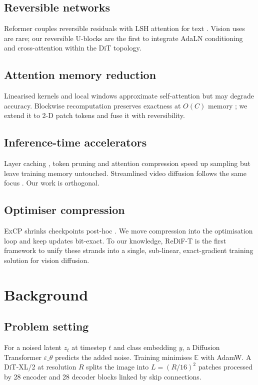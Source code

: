 \documentclass{article}
\begin{document}
\subsection{Reversible networks}
Reformer couples reversible residuals with LSH attention for text \cite{kitaev-2020-reformer}. Vision uses are rare; our reversible U-blocks are the first to integrate AdaLN conditioning and cross-attention within the DiT topology.
\subsection{Attention memory reduction}
Linearised kernels \cite{likhosherstov-2020-sub} and local windows \cite{liu-2021-swin} approximate self-attention but may degrade accuracy. Blockwise recomputation preserves exactness at \(O(C)\) memory \cite{liu-2023-blockwise}; we extend it to 2-D patch tokens and fuse it with reversibility.
\subsection{Inference-time accelerators}
Layer caching \cite{ma-2024-learning}, token pruning \cite{wang-2024-attention} and attention compression \cite{yuan-2024-ditfastattn} speed up sampling but leave training memory untouched. Streamlined video diffusion follows the same focus \cite{zhan-2024-fast}. Our work is orthogonal.
\subsection{Optimiser compression}
ExCP shrinks checkpoints post-hoc \cite{li-2024-excp}. We move compression into the optimisation loop and keep updates bit-exact.
To our knowledge, ReDiF-T is the first framework to unify these strands into a single, sub-linear, exact-gradient training solution for vision diffusion.

\section{Background}
\subsection{Problem setting}
For a noised latent \(z_t\) at timestep \(t\) and class embedding \(y\), a Diffusion Transformer \(\varepsilon\_\theta\) predicts the added noise. Training minimises \(\mathbb{E}\) with AdamW. A DiT-XL/2 at resolution \(R\) splits the image into \(L=(R/16)^2\) patches processed by 28 encoder and 28 decoder blocks linked by skip connections.
\end{document}
